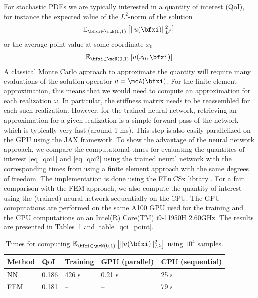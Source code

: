\documentclass[12pt]{article}
\begin{document}
For stochastic PDEs we are typically interested in a quantity of interest (QoI), for instance the expected value of the $L^2$-norm of the solution
\begin{align}
	\mathbb{E}_{\bfxi \in \mcN(0,1)}\left[\|u(\bfxi)\|^2_{L^2}\right]
	\label{eq_qoi1}
\end{align}
or the average point value at some coordinate $x_0$
\begin{align}
	\mathbb{E}_{\bfxi \in \mcN(0,1)}\left[u(x_0,\bfxi)\right]
	\label{eq_qoi2}
\end{align}
A classical Monte Carlo approach to approximate the quantity will require many evaluations of the solution operator $u = \mcA(\bfxi)$. For the finite element approximation, this means that we would need to compute an approximation for each realization $\omega$. In particular, the stiffness matrix needs to be reassembled for each such realization. However, for the trained neural network, retrieving an approximation for a given realization is a simple forward pass of the network which is typically very fast (around 1 ms). This step is also easily parallelized on the GPU using the JAX framework. To show the advantage of the neural network approach, we compare the computational times for evaluating the quantities of interest \eqref{eq_qoi1} and \eqref{eq_qoi2} using the trained neural network with the corresponding times from using a finite element approach with the same degrees of freedom. The implementation is done using the FEniCSx library \cite{fenicsx}. For a fair comparison with the FEM approach, we also compute the quantity of interest using the (trained) neural network sequentially on the CPU. The GPU computations are performed on the same A100 GPU used for the training and the CPU computations on an Intel(R) Core(TM) i9-11950H 2.60GHz. The results are presented in Tables~\ref{table_qoi} and \ref{table_qoi_point}.

\begin{table}[h!]
	\caption{Times for computing $\mathbb{E}_{\bfxi \in \mcN(0,1)}\left[\|u(\bfxi)\|^2_{L^2}\right]$ using $10^4$ samples.}
	\centering
	\begin{tabular}{|l|l|l|l|l|}
		\hline
		Method & QoI & Training & GPU (parallel)  & CPU (sequential) \\ \hline
		NN & 0.186 & 426 s & 0.21 s & 25 s \\ \hline
		FEM & 0.181 & -- &  -- & 79 s \\ \hline
	\end{tabular}\label{table_qoi}
\end{table}
\end{document}

